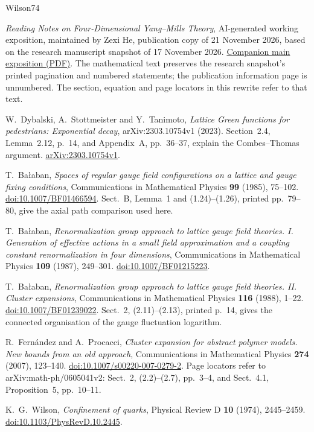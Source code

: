 \documentclass[11pt,reqno]{amsart}
\numberwithin{equation}{section}
\theoremstyle{definition}
\theoremstyle{remark}
\begin{document}
\begin{thebibliography}{Wilson74}
\raggedright
{}
\emph{Reading Notes on Four-Dimensional Yang--Mills Theory},
AI-generated working exposition, maintained by Zexi He,
publication copy of 21 November 2026, based on the research manuscript
snapshot of 17 November 2026.
\href{../4DYM_reading_notes.pdf}{Companion main exposition (PDF)}.
The mathematical text preserves the research snapshot's printed
pagination and numbered statements; the publication information page
is unnumbered. The section, equation and page locators in this rewrite
refer to that text.

W.~Dybalski, A.~Stottmeister and Y.~Tanimoto,
\emph{Lattice Green functions for pedestrians: Exponential decay},
arXiv:2303.10754v1 (2023).
Section~2.4, Lemma~2.12, p.~14, and Appendix~A, pp.~36--37,
explain the Combes--Thomas argument.
\href{https://arxiv.org/abs/2303.10754v1}{arXiv:2303.10754v1}.

T.~Ba{\l}aban,
\emph{Spaces of regular gauge field configurations on a lattice
and gauge fixing conditions},
Communications in Mathematical Physics \textbf{99} (1985), 75--102.
\href{https://doi.org/10.1007/BF01466594}{doi:10.1007/BF01466594}.
Sect.~B, Lemma~1 and (1.24)--(1.26), printed pp.~79--80,
give the axial path comparison used here.

T.~Ba{\l}aban,
\emph{Renormalization group approach to lattice gauge field theories.
I. Generation of effective actions in a small field approximation
and a coupling constant renormalization in four dimensions},
Communications in Mathematical Physics \textbf{109} (1987), 249--301.
\href{https://doi.org/10.1007/BF01215223}{doi:10.1007/BF01215223}.

T.~Ba{\l}aban,
\emph{Renormalization group approach to lattice gauge field theories.
II. Cluster expansions},
Communications in Mathematical Physics \textbf{116} (1988), 1--22.
\href{https://doi.org/10.1007/BF01239022}{doi:10.1007/BF01239022}.
Sect.~2, (2.11)--(2.13), printed p.~14, gives the connected
organisation of the gauge fluctuation logarithm.

R.~Fern\'andez and A.~Procacci,
\emph{Cluster expansion for abstract polymer models.
New bounds from an old approach},
Communications in Mathematical Physics \textbf{274} (2007), 123--140.
\href{https://doi.org/10.1007/s00220-007-0279-2}{doi:10.1007/s00220-007-0279-2}.
Page locators refer to arXiv:math-ph/0605041v2:
Sect.~2, (2.2)--(2.7), pp.~3--4, and Sect.~4.1,
Proposition~5, pp.~10--11.

K.~G.~Wilson, \emph{Confinement of quarks},
Physical Review D \textbf{10} (1974), 2445--2459.
\href{https://doi.org/10.1103/PhysRevD.10.2445}{doi:10.1103/PhysRevD.10.2445}.
\end{thebibliography}
\end{document}
